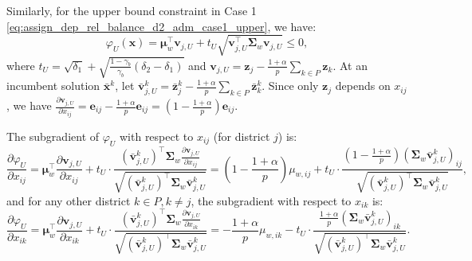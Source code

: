 \documentclass[preprint,12pt,authoryear]{elsarticle}
\begin{document}
Similarly, for the upper bound constraint in Case 1 \eqref{eq:assign_dep_rel_balance_d2_adm_case1_upper}, we have:
\begin{equation}
\varphi_U(\mathbf{x}) = \boldsymbol{\mu}_w^\top \mathbf{v}_{j,U} + t_U \sqrt{\mathbf{v}_{j,U}^\top \boldsymbol{\Sigma}_w \mathbf{v}_{j,U}} \leqslant 0,
\end{equation}
where $t_U = \sqrt{\delta_1} + \sqrt{\frac{1 - \gamma_b}{\gamma_b} (\delta_2 - \delta_1)}$ and $\mathbf{v}_{j,U} = \mathbf{z}_j - \frac{1+\alpha}{p}\sum_{k \in P} \mathbf{z}_k$. At an incumbent solution $\bar{\mathbf{x}}^k$, let $\bar{\mathbf{v}}_{j,U}^k = \bar{\mathbf{z}}_j^k - \frac{1+\alpha}{p}\sum_{k \in P} \bar{\mathbf{z}}_k^k$. Since only $\mathbf{z}_j$ depends on $x_{ij}$, we have $\frac{\partial \mathbf{v}_{j,U}}{\partial x_{ij}} = \mathbf{e}_{ij} - \frac{1+\alpha}{p}\mathbf{e}_{ij} = \left(1 - \frac{1+\alpha}{p}\right)\mathbf{e}_{ij}$.

The subgradient of $\varphi_U$ with respect to $x_{ij}$ (for district $j$) is:
\begin{equation}
\frac{\partial \varphi_U}{\partial x_{ij}} = \boldsymbol{\mu}_w^\top \frac{\partial \mathbf{v}_{j,U}}{\partial x_{ij}} + t_U \cdot \frac{(\bar{\mathbf{v}}_{j,U}^k)^\top \boldsymbol{\Sigma}_w \frac{\partial \mathbf{v}_{j,U}}{\partial x_{ij}}}{\sqrt{(\bar{\mathbf{v}}_{j,U}^k)^\top \boldsymbol{\Sigma}_w \bar{\mathbf{v}}_{j,U}^k}} = \left(1 - \frac{1+\alpha}{p}\right) \mu_{w,ij} + t_U \cdot \frac{\left(1 - \frac{1+\alpha}{p}\right) (\boldsymbol{\Sigma}_w \bar{\mathbf{v}}_{j,U}^k)_{ij}}{\sqrt{(\bar{\mathbf{v}}_{j,U}^k)^\top \boldsymbol{\Sigma}_w \bar{\mathbf{v}}_{j,U}^k}},
\label{eq:assign_dep_rel_subgradient_U_ij}
\end{equation}
and for any other district $k \in P, k \neq j$, the subgradient with respect to $x_{ik}$ is:
\begin{equation}
\frac{\partial \varphi_U}{\partial x_{ik}} = \boldsymbol{\mu}_w^\top \frac{\partial \mathbf{v}_{j,U}}{\partial x_{ik}} + t_U \cdot \frac{(\bar{\mathbf{v}}_{j,U}^k)^\top \boldsymbol{\Sigma}_w \frac{\partial \mathbf{v}_{j,U}}{\partial x_{ik}}}{\sqrt{(\bar{\mathbf{v}}_{j,U}^k)^\top \boldsymbol{\Sigma}_w \bar{\mathbf{v}}_{j,U}^k}} = -\frac{1+\alpha}{p} \mu_{w,ik} - t_U \cdot \frac{\frac{1+\alpha}{p} (\boldsymbol{\Sigma}_w \bar{\mathbf{v}}_{j,U}^k)_{ik}}{\sqrt{(\bar{\mathbf{v}}_{j,U}^k)^\top \boldsymbol{\Sigma}_w \bar{\mathbf{v}}_{j,U}^k}}.
\label{eq:assign_dep_rel_subgradient_U_ik}
\end{equation}
\end{document}
